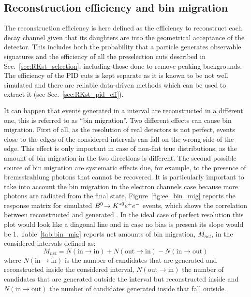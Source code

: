 \subsection{Reconstruction efficiency and bin migration}
\label{sec:reco_binmig}

The reconstruction efficiency is here defined as the efficiency to reconstruct
each decay channel given that its daughters are into the geometrical acceptance
of the detector. This includes both the probability that a particle generates
observable signatures and the efficiency of all the preselection cuts described in Sec.~\ref{sec:RKst_selection},
including those done to remove peaking backgrounds. 
The efficiency of the PID cuts is kept separate as it is known to be not well simulated
and there are reliable data-driven methods which can be used to extract it (see Sec.~\ref{sec:RKst_pid_eff}).

It can happen that events generated in a \qsq interval are reconstructed in a different one,
this is referred to as ``bin migration''. Two different effects can cause bin migration.
First of all, as the resolution of real detectors is not perfect, events close to the edges
of the considered intervals can fall on the wrong side of the edge. This effect is only important
in case of non-flat true distributions, as the amount of bin migration in the two directions is different.
The second possible source of bin migration are systematic effects due, for example,
to the presence of bremsstrahlung photons that cannot be recovered.
It is particularly important to take into account the bin migration in the electron channels case 
because more photons are radiated from the final state.
Figure~\ref{fig:ee_bin_mig} reports the response matrix for simulated ${{B}^0}\!\rightarrow {\ensuremath{{K}^{*0}}}e^+ e^-$ events,
which shows the correlation between reconstructed and generated \qsq. In the ideal case of
perfect resolution this plot would look like a diagonal line and in case no bias is present
its slope would be 1. Table~\ref{tab:bin_mig} reports net amounts of bin migration, $M_{net}$, 
in the considered \qsq intervals defined as:
%
\begin{equation}
M_{net} = N(\text{in} \to \text{in}) + N(\text{out} \to \text{in}) - N(\text{in} \to \text{out}) 
\end{equation}
%
\noindent
where $N(\text{in} \to \text{in})$ is the number of candidates that are generated and
reconstructed inside the considered interval, $N(\text{out} \to \text{in})$ the number of 
candidates that are generated outside the interval but reconstructed inside and
$N(\text{in} \to \text{out})$ the number of candidates generated inside that fall outside.

